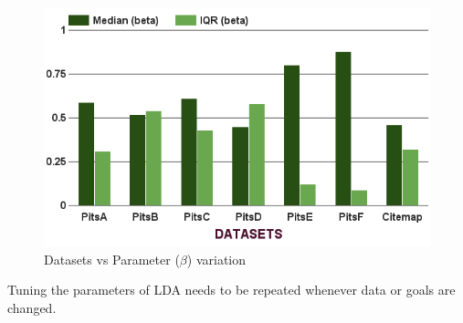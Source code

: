 \documentclass[10pt,conference]{IEEEtran}
\theoremstyle{break}
\begin{document}
\begin{figure}[!htbp]
\begin{minipage}{.33\textwidth}
        \includegraphics[width=\linewidth]{./fig/Parameters_variation_b.png}
        \caption{Datasets vs Parameter ($\beta$) variation}
        \label{RQ3:b}
    \end{minipage}
\end{figure}

\begin{lesson}
Tuning the parameters of LDA needs to be repeated whenever data or goals are changed.
\end{lesson}
\end{document}
